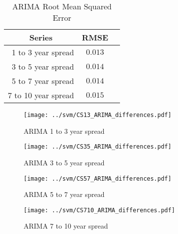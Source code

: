 \documentclass[12pt]{article}
\begin{document}
        \begin{table}[H]
            \centering
            \caption{ARIMA Root Mean Squared Error}
            \begin{tabular}{|r|c|c|} \hline
                \multicolumn{1}{|c|}{Series}                & \multicolumn{1}{|c|}{RMSE}   \\ \hline\hline
                \multicolumn{1}{|r|}{1 to 3 year spread}    & \multicolumn{1}{|c|}{$0.013$}    \\ \hline
                \multicolumn{1}{|r|}{3 to 5 year spread}    & \multicolumn{1}{|c|}{$0.014$}   \\ \hline
                \multicolumn{1}{|r|}{5 to 7 year spread}    & \multicolumn{1}{|c|}{$0.014$}    \\ \hline
                \multicolumn{1}{|r|}{7 to 10 year spread}   & \multicolumn{1}{|c|}{$0.015$}    \\ \hline
            \end{tabular}
            \label{tab:ARIMA}
        \end{table}

        \begin{minipage}{0.5\textwidth}
            \begin{figure}[H]
                \centering
                \caption{ARIMA 1 to 3 year spread}
                \texttt{[image: ../svm/CS13\_ARIMA\_differences.pdf]}
                \label{fig:ARIMA13}
            \end{figure}
        \end{minipage}
        \begin{minipage}{0.5\textwidth}
            \begin{figure}[H]
                \centering
                \caption{ARIMA 3 to 5 year spread}
                \texttt{[image: ../svm/CS35\_ARIMA\_differences.pdf]}
                \label{fig:ARIMA35}
            \end{figure}
        \end{minipage}

        \begin{minipage}{0.5\textwidth}
            \begin{figure}[H]
                \centering
                \caption{ARIMA 5 to 7 year spread}
                \texttt{[image: ../svm/CS57\_ARIMA\_differences.pdf]}
                \label{fig:ARIMA57}
            \end{figure}
        \end{minipage}
        \begin{minipage}{0.5\textwidth}
            \begin{figure}[H]
                \centering
                \caption{ARIMA 7 to 10 year spread}
                \texttt{[image: ../svm/CS710\_ARIMA\_differences.pdf]}
                \label{fig:ARIMA710}
            \end{figure}
        \end{minipage}
\end{document}
